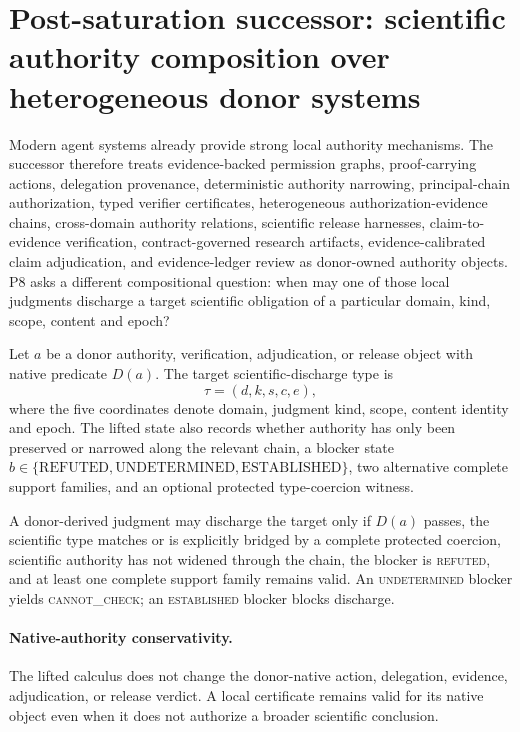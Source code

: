 \section{Post-saturation successor: scientific authority composition over heterogeneous donor systems}

Modern agent systems already provide strong local authority mechanisms. The successor therefore treats evidence-backed permission graphs, proof-carrying actions, delegation provenance, deterministic authority narrowing, principal-chain authorization, typed verifier certificates, heterogeneous authorization-evidence chains, cross-domain authority relations, scientific release harnesses, claim-to-evidence verification, contract-governed research artifacts, evidence-calibrated claim adjudication, and evidence-ledger review as donor-owned authority objects. P8 asks a different compositional question: when may one of those local judgments discharge a target scientific obligation of a particular domain, kind, scope, content and epoch?

Let $a$ be a donor authority, verification, adjudication, or release object with native predicate $D(a)$. The target scientific-discharge type is
\[
\tau=(d,k,s,c,e),
\]
where the five coordinates denote domain, judgment kind, scope, content identity and epoch. The lifted state also records whether authority has only been preserved or narrowed along the relevant chain, a blocker state $b\in\{\mathrm{REFUTED},\mathrm{UNDETERMINED},\mathrm{ESTABLISHED}\}$, two alternative complete support families, and an optional protected type-coercion witness.

A donor-derived judgment may discharge the target only if $D(a)$ passes, the scientific type matches or is explicitly bridged by a complete protected coercion, scientific authority has not widened through the chain, the blocker is \textsc{refuted}, and at least one complete support family remains valid. An \textsc{undetermined} blocker yields \textsc{cannot\_check}; an \textsc{established} blocker blocks discharge.

\paragraph{Native-authority conservativity.}
The lifted calculus does not change the donor-native action, delegation, evidence, adjudication, or release verdict. A local certificate remains valid for its native object even when it does not authorize a broader scientific conclusion.

